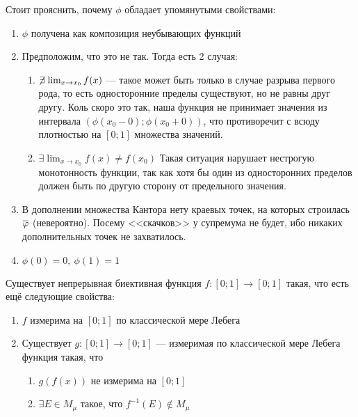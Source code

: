 \begin{note}
	Стоит прояснить, почему $\phi$ обладает упомянутыми свойствами:
	\begin{enumerate}
		\item $\phi$ получена как композиция неубывающих функций
		
		\item Предположим, что это не так. Тогда есть 2 случая:
		\begin{enumerate}
			\item $\centernot\exists \lim_{x \to x_0} f(x)$ --- такое может быть только в случае разрыва первого рода, то есть односторонние пределы существуют, но не равны друг другу. Коль скоро это так, наша функция не принимает значения из интервала $(\phi(x_0 - 0); \phi(x_0 + 0))$, что противоречит с всюду плотностью на $[0; 1]$ множества значений.
			
			\item $\exists \lim_{x \to x_0} f(x) \neq f(x_0)$ Такая ситуация нарушает нестрогую монотонность функции, так как хотя бы один из односторонних пределов должен быть по другую сторону от предельного значения.
		\end{enumerate}
		
		\item В дополнении множества Кантора нету краевых точек, на которых строилась $\overline{\varphi}$ (невероятно). Посему <<скачков>> у супремума не будет, ибо никаких дополнительных точек не захватилось.
		
		\item $\phi(0) = 0,\ \phi(1) = 1$
	\end{enumerate}
\end{note}

\begin{theorem}
	Существует непрерывная биективная функция $f \colon [0; 1] \to [0; 1]$ такая, что есть ещё следующие свойства:
	\begin{enumerate}
		\item $f$ измерима на $[0; 1]$ по классической мере Лебега
		
		\item Существует $g \colon [0; 1] \to [0; 1]$ --- измеримая по классической мере Лебега функция такая, что
		\begin{enumerate}
			\item $g(f(x))$ не измерима на $[0; 1]$
			
			\item $\exists E \in M_\mu$ такое, что $f^{-1}(E) \notin M_\mu$
		\end{enumerate}
	\end{enumerate}
\end{theorem}

